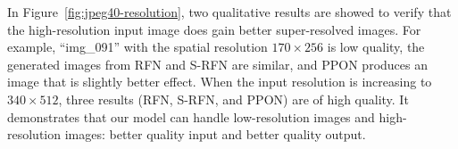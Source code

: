 \documentclass[preprint]{elsarticle}
\begin{document}
In Figure~\ref{fig:jpeg40-resolution}, two qualitative results are showed to verify that the high-resolution input image does gain better super-resolved images. For example, ``img\_091'' with the spatial resolution $170 \times 256$ is low quality, the generated images from RFN and S-RFN are similar, and PPON produces an image that is slightly better effect. When the input resolution is increasing to $340 \times 512$, three results (RFN, S-RFN, and PPON) are of high quality. It demonstrates that our model can handle low-resolution images and high-resolution images: better quality input and better quality output.
\end{document}
